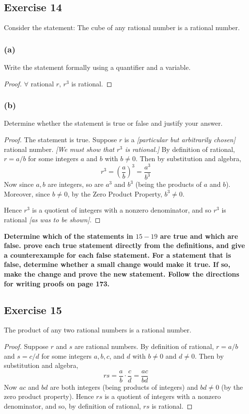 \documentclass[14pt]{extarticle}
\newcommand{\fa}{\forall}
\newcommand{\cy}{\color{cyan}}
\begin{document}
\subsection{Exercise 14}
Consider the statement: The cube of any rational number is a rational number.

\subsubsection{(a)}
Write the statement formally using a quantifier and a variable.

\begin{proof}
$\fa$ rational $r$, $r^3$ is rational.
\end{proof}

\subsubsection{(b)}
Determine whether the statement is true or false and justify your answer.

\begin{proof}
The statement is true. Suppose $r$ is a {\it [particular but arbitrarily chosen]} rational number. {\it [We must show that $r^3$ is rational.]} By definition of rational, $r = a/b$ for some integers $a$ and $b$ with $b \neq 0$. Then by substitution and algebra,
\[
r^3 = \left(\frac{a}{b}\right)^3 = \frac{a^3}{b^3}
\]
Now since $a, b$ are integers, so are $a^3$ and $b^3$ (being the products of $a$ and $b$). Moreover, since $b \neq 0$, by the Zero Product Property, $b^3 \neq 0$. 

Hence $r^3$ is a quotient of integers with a nonzero denominator, and so $r^3$ is rational {\it [as was to be shown]}.
\end{proof}

{\bf \cy Determine which of the statements in $15-19$ are true and which are false. prove each true statement directly from the definitions, and give a counterexample for each false statement. For a statement that is false, determine whether a small change would make it true. If so, make the change and prove the new statement. Follow the directions for writing proofs on page 173.}

\subsection{Exercise 15}
The product of any two rational numbers is a rational number.

\begin{proof}
Suppose $r$ and $s$ are rational numbers. By definition of rational, $r = a/b$ and $s = c/d$ for some integers $a, b, c$, and $d$ with $b \neq 0$ and $d \neq 0$. Then by substitution and algebra,
\[
rs = \frac{a}{b} \cdot \frac{c}{d} = \frac{ac}{bd}
\]
Now $ac$ and $bd$ are both integers (being products of integers) and $bd \neq 0$ (by the zero product property). Hence $rs$ is a quotient of integers with a nonzero denominator, and so, by definition of rational, $rs$ is rational.
\end{proof}
\end{document}
